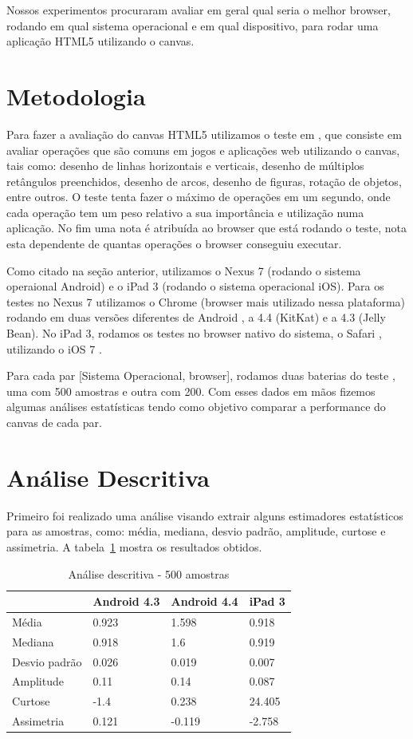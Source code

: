 \documentclass[11pt,a4paper]{article}
\begin{document}
Nossos experimentos procuraram avaliar em geral qual seria o melhor browser, rodando em qual sistema operacional e
em qual dispositivo, para rodar uma aplicação HTML5 utilizando o canvas.

\section{Metodologia}
Para fazer a avaliação do canvas HTML5 utilizamos o teste em \cite{benchmark}, que consiste em avaliar operações que são
comuns em jogos e aplicações web utilizando o canvas, tais como: desenho de linhas horizontais e verticais, desenho de
múltiplos retângulos preenchidos, desenho de arcos, desenho de figuras, rotação de objetos, entre outros. O teste tenta
fazer o máximo de operações em um segundo, onde cada operação tem um peso relativo a sua importância e utilização numa
aplicação. No fim uma nota é atribuída ao browser que está rodando o teste, nota esta dependente de quantas operações o
browser conseguiu executar.

Como citado na seção anterior, utilizamos o Nexus 7 (rodando o sistema operaional Android) e o iPad 3 (rodando o sistema
operacional iOS). Para os testes no Nexus 7 utilizamos o Chrome \cite{chrome} (browser mais utilizado nessa plataforma)
rodando em duas versões diferentes de Android \cite{android}, a 4.4 (KitKat) e a 4.3 (Jelly Bean). No iPad 3, rodamos os
testes no browser nativo do sistema, o Safari \cite{safari}, utilizando o iOS 7 \cite{ios7}.

Para cada par [Sistema Operacional, browser], rodamos duas baterias do teste \cite{benchmark}, uma com 500 amostras e
outra com 200. Com esses dados em mãos fizemos algumas análises estatísticas tendo como objetivo comparar a performance
do canvas de cada par.

\section{Análise Descritiva}\label{analise descritiva}

Primeiro foi realizado uma análise visando extrair alguns estimadores estatísticos para as amostras, como: média,
mediana, desvio padrão, amplitude, curtose e assimetria. A tabela~\ref{descritiva} mostra os resultados obtidos.

\begin{table}[H]
    \centering
    \caption{Análise descritiva - 500 amostras}
    \label{descritiva}
    \begin{tabular}{| l | l | l | l |}
    \hline
     & Android 4.3 & Android 4.4 & iPad 3 \\ \hline
    Média & 0.923 & 1.598 & 0.918 \\ \hline
    Mediana & 0.918 & 1.6 & 0.919 \\ \hline
    Desvio padrão & 0.026 & 0.019 & 0.007 \\ \hline
    Amplitude & 0.11 & 0.14 & 0.087 \\ \hline
    Curtose & -1.4 & 0.238 & 24.405 \\ \hline
    Assimetria & 0.121 & -0.119 & -2.758 \\ \hline
    \end{tabular}
\end{table}
\end{document}
